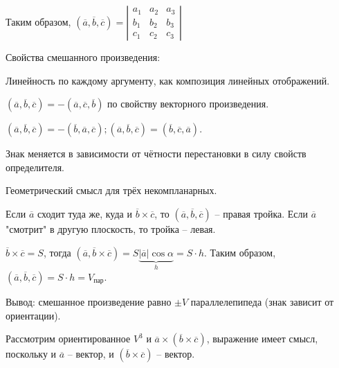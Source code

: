 \begin{Example}
		Таким образом, $(\overline{a}, \overline{b}, \overline{c}) = \left|\begin{array}{cccc}
			a_1  & a_2  & a_3  \\ 
			b_1 &  b_2 & b_3 \\ 
			c_1 & c_2 & c_3
			\end{array}\right|$
	\end{Example}

	Свойства смешанного произведения:
	\begin{MyList}
		\item Линейность по каждому аргументу, как композиция линейных отображений.
		\item $(\overline{a}, \overline{b}, \overline{c}) = - (\overline{a}, \overline{c}, \overline{b})$ по свойству векторного произведения.
		
			  $(\overline{a}, \overline{b}, \overline{c}) = - (\overline{b}, \overline{a}, \overline{c}); (\overline{a}, \overline{b}, \overline{c}) = (\overline{b}, \overline{c}, \overline{a})$.

			  Знак меняется в зависимости от чётности перестановки в силу свойств определителя.
		\item Геометрический смысл для трёх некомпланарных.

			Если $\overline{a}$ сходит туда же, куда и $\overline{b} \times \overline{c}$, то $(\overline{a}, \overline{b}, \overline{c})$ -- правая тройка. Если $\overline{a}$ "смотрит" в другую плоскость, то тройка -- левая.

			$\overline{b} \times \overline{c} = S$, тогда $(\overline{a}, \overline{b} \times \overline{c}) = S \underbrace{|\overline{a}| \cos \alpha}_{h} = S\cdot h$.
			Таким образом, $(\overline{a}, \overline{b}, \overline{c}) = S\cdot h = V_{\text{пар}}$. 

			Вывод: смешанное произведение равно $\pm V$ параллелепипеда (знак зависит от ориентации).
	\end{MyList}
	
	\begin{figure*}[h]
		\centering
		\def\svgwidth{0.5\columnwidth}
		
	\end{figure*}


	Рассмотрим ориентированное $V^3$ и $\overline{a} \times (\overline{b} \times \overline{c})$, выражение имеет смысл, поскольку и $\overline{a}$ -- вектор, и $(\overline{b} \times \overline{c})$ -- вектор. 

